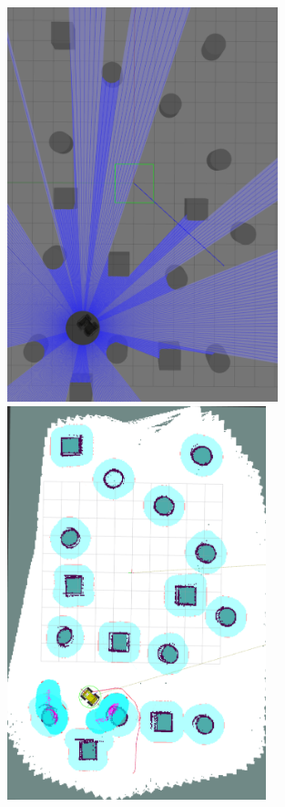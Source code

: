 \begin{figure}[H]
  \centering
  \begin{minipage}[b]{0.49\textwidth}
        \centering
        \includegraphics[width = 0.7\textwidth]{Figures/figNav2GazeboSim2.pdf}
  \end{minipage}
  \hfill
  \begin{minipage}[b]{0.49\textwidth}
    \centering
    \includegraphics[width = 0.67\textwidth]{Figures/figNav2MapSim2.pdf}

\end{minipage}
\end{figure}
